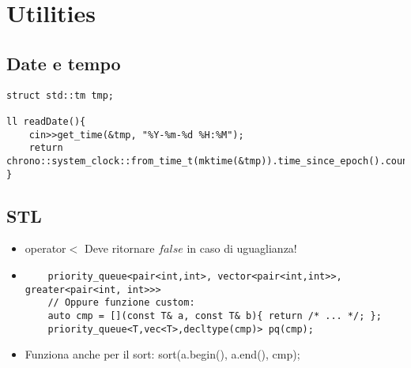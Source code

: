\section{Utilities}

\subsection{Date e tempo}
\begin{lstlisting}
struct std::tm tmp;

ll readDate(){
	cin>>get_time(&tmp, "%Y-%m-%d %H:%M");
	return chrono::system_clock::from_time_t(mktime(&tmp)).time_since_epoch().count();
}
\end{lstlisting}

\subsection{STL}
\begin{itemize}
    \item operator$<$ Deve ritornare $false$ in caso di uguaglianza!
    \item \begin{lstlisting}
    priority_queue<pair<int,int>, vector<pair<int,int>>, greater<pair<int, int>>>
    // Oppure funzione custom:
    auto cmp = [](const T& a, const T& b){ return /* ... */; };
    priority_queue<T,vec<T>,decltype(cmp)> pq(cmp);
    \end{lstlisting}
    \item Funziona anche per il sort: sort(a.begin(), a.end(), cmp);
\end{itemize}
